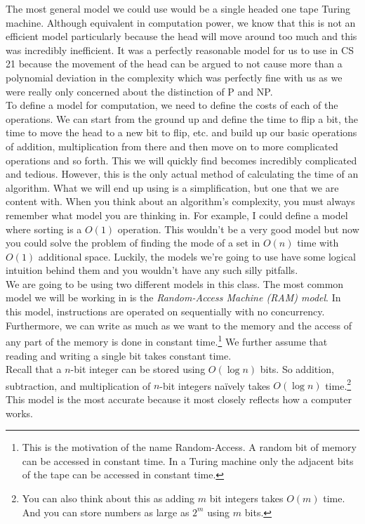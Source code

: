 \documentclass[10pt]{article}
\theoremstyle{plain}
\theoremstyle{definition}
\numberwithin{equation}{section}
\numberwithin{figure}{section}
\begin{document}
\noindent The most general model we could use would be a single headed one tape Turing machine. Although equivalent in computation power, we know that this is not an efficient model particularly because the head will move around too much and this was incredibly inefficient. It was a perfectly reasonable model for us to use in CS 21 because the movement of the head can be argued to not cause more than a polynomial deviation in the complexity which was perfectly fine with us as we were really only concerned about the distinction of P and NP. \\

\noindent To define a model for computation, we need to define the costs of each of the operations. We can start from the ground up and define the time to flip a bit, the time to move the head to a new bit to flip, etc. and build up our basic operations of addition, multiplication from there and then move on to more complicated operations and so forth. This we will quickly find becomes incredibly complicated and tedious. However, this is the only actual method of calculating the time of an algorithm. What we will end up using is a simplification, but one that we are content with. When you think about an algorithm's complexity, you must always remember what model you are thinking in. For example, I could define a model where sorting is a $O(1)$ operation. This wouldn't be a very good model but now you could solve the problem of finding the mode of a set in $O(n)$ time with $O(1)$ additional space. Luckily, the models we're going to use have some logical intuition behind them and you wouldn't have any such silly pitfalls. \\

\noindent We are going to be using two different models in this class. The most common model we will be working in is the \emph{Random-Access Machine (RAM) model}. In this model, instructions are operated on sequentially with no concurrency. Furthermore, we can write as much as we want to the memory and the access of any part of the memory is done in constant time.\footnote{This is the motivation of the name Random-Access. A random bit of memory can be accessed in constant time. In a Turing machine only the adjacent bits of the tape can be accessed in constant time.} We further assume that reading and writing a single bit takes constant time. \\

\noindent Recall that a $n$-bit integer can be stored using $O(\log n)$ bits. So addition, subtraction, and multiplication of $n$-bit integers na\"ively takes $O(\log n)$ time.\footnote{You can also think about this as adding $m$ bit integers takes $O(m)$ time. And you can store numbers as large as $2^m$ using $m$ bits.} This model is the most accurate because it most closely reflects how a computer works. \\
\end{document}
